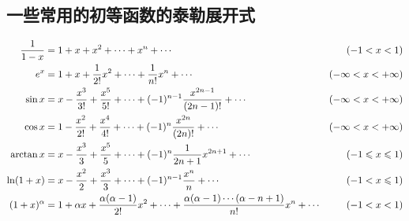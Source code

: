 \documentclass[UTF8]{ctexart}
\begin{document}
\newpage
\subsection{一些常用的初等函数的泰勒展开式}
$$\begin{aligned}
\frac{1}{1-x}&=1+x+x^2+\cdots+x^n+\cdots&(-1<x<1)\\
e^{x}&=1+x+\frac{1}{2 !} x^{2}+\cdots+\frac{1}{n !} x^{n}+\cdots \hspace{3.5cm}&(-\infty<x<+\infty)\\
\sin x&=x-\frac{x^{3}}{3 !}+\frac{x^{5}}{5 !}+\cdots+(-1)^{n-1} \frac{x^{2 n-1}}{(2 n-1) !}+\cdots \hspace{2cm}&(-\infty<x<+\infty)\\
\cos x&=1-\frac{x^{2}}{2 !}+\frac{x^{4}}{4 !}+\cdots+(-1)^{n} \frac{x^{2 n}}{(2 n) !}+\cdots\hspace{3cm}&(-\infty<x<+\infty)\\
\arctan x&=x-\frac{x^{3}}{3}+\frac{x^{5}}{5}+\cdots+(-1)^{n} \frac{1}{2 n+1} x^{2 n+1}+\cdots\hspace{2cm}&(-1 \leqslant x \leqslant 1)\\
\ln (1+x)&=x-\frac{x^{2}}{2}+\frac{x^{3}}{3}+\cdots+(-1)^{n-1} \frac{x^{n}}{n}+\cdots\hspace{3cm}&(-1<x \leqslant 1)\\
(1+x)^{\alpha}&=1+\alpha x+\frac{\alpha(\alpha-1)}{2 !} x^{2}+\cdots+\frac{\alpha(\alpha-1) \cdots(\alpha-n+1)}{n !} x^{n}+\cdots&(-1<x<1)
\end{aligned}$$
\end{document}
